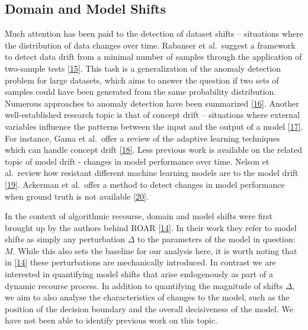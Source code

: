 \documentclass[
  conference]{IEEEtran}
\begin{document}
\hypertarget{sec-related-shifts}{%
\subsection{Domain and Model Shifts}\label{sec-related-shifts}}

Much attention has been paid to the detection of dataset shifts --
situations where the distribution of data changes over time. Rabanser et
al.~suggest a framework to detect data drift from a minimal number of
samples through the application of two-sample tests
\protect\hyperlink{ref-rabanser2019failing}{{[}15{]}}. This task is a
generalization of the anomaly detection problem for large datasets,
which aims to answer the question if two sets of samples could have been
generated from the same probability distribution. Numerous approaches to
anomaly detection have been summarized
\protect\hyperlink{ref-chandola2009anomaly}{{[}16{]}}. Another
well-established research topic is that of concept drift -- situations
where external variables influence the patterns between the input and
the output of a model
\protect\hyperlink{ref-widmer1996learning}{{[}17{]}}. For instance, Gama
et al.~offer a review of the adaptive learning techniques which can
handle concept drift \protect\hyperlink{ref-gama2014survey}{{[}18{]}}.
Less previous work is available on the related topic of model drift -
changes in model performance over time. Nelson et al.~review how
resistant different machine learning models are to the model drift
\protect\hyperlink{ref-nelson2015evaluating}{{[}19{]}}. Ackerman et
al.~offer a method to detect changes in model performance when ground
truth is not available
\protect\hyperlink{ref-ackerman2021machine}{{[}20{]}}.

In the context of algorithmic recourse, domain and model shifts were
first brought up by the authors behind ROAR
\protect\hyperlink{ref-upadhyay2021towards}{{[}14{]}}. In their work
they refer to model shifts as simply any perturbation \(\Delta\) to the
parameters of the model in question: \(M\). While this also sets the
baseline for our analysis here, it is worth noting that in
\protect\hyperlink{ref-upadhyay2021towards}{{[}14{]}} these
perturbations are mechanically introduced. In contrast we are interested
in quantifying model shifts that arise endogenously as part of a dynamic
recourse process. In addition to quantifying the magnitude of shifts
\(\Delta\), we aim to also analyse the characteristics of changes to the
model, such as the position of the decision boundary and the overall
decisiveness of the model. We have not been able to identify previous
work on this topic.
\end{document}
